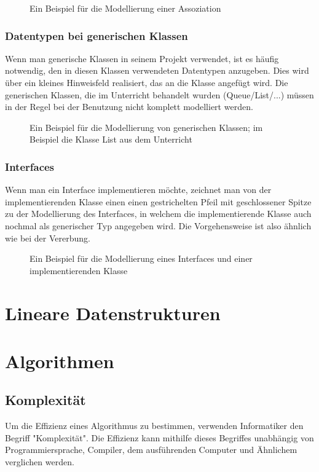 \documentclass{article}
\begin{document}
	\begin{figure}[h!]
		\centering
		
		\caption{Ein Beispiel für die Modellierung einer Assoziation}
	\end{figure}

	\subsubsection{Datentypen bei generischen Klassen}
	Wenn man generische Klassen in seinem Projekt verwendet, ist es häufig notwendig, den in diesen Klassen verwendeten Datentypen anzugeben. Dies wird über ein kleines Hinweisfeld realisiert, das an die Klasse angefügt wird. Die generischen Klassen, die im Unterricht behandelt wurden (Queue/List/...) müssen in der Regel bei der Benutzung nicht komplett modelliert werden. 

	\begin{figure}[h!]
		\centering
		
		\caption{Ein Beispiel für die Modellierung von generischen Klassen; im Beispiel die Klasse List aus dem Unterricht}
	\end{figure}

	\subsubsection{Interfaces}
	Wenn man ein Interface implementieren möchte, zeichnet man von der implementierenden Klasse einen einen gestrichelten Pfeil mit geschlossener Spitze zu der Modellierung des Interfaces, in welchem die implementierende Klasse auch nochmal als generischer Typ angegeben wird. Die Vorgehensweise ist also ähnlich wie bei der Vererbung.

	\begin{figure}[h!]
		\centering
		
		\caption{Ein Beispiel für die Modellierung eines Interfaces und einer implementierenden Klasse}
	\end{figure}
	

	\section{Lineare Datenstrukturen}

	\section{Algorithmen}
	\subsection{Komplexität}
	Um die Effizienz eines Algorithmus zu bestimmen, verwenden Informatiker den Begriff "Komplexität". Die Effizienz kann mithilfe dieses Begriffes unabhängig von Programmiersprache, Compiler, dem ausführenden Computer und Ähnlichem verglichen werden.
\end{document}
